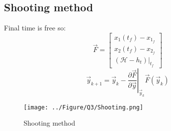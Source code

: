 \subsection{Shooting method}
Final time is free so:
$$
\vec{F} = \begin{bmatrix}
	x_1(t_f) - x_{1_f}\\
	x_2(t_f) - x_{2_f}\\
	\left.(\mathcal{H} - h_t)\right\vert_{t_f}
\end{bmatrix}
$$
$$
\vec{y}_{k+1} = \vec{y}_k - \left.\dfrac{\partial \vec{F}}{\partial \vec{y}}
\right\vert_{\vec{y}_k}
\vec{F}(\vec{y}_k)
$$
\begin{figure}[H]
	\caption{Shooting method}
	\centering
	\texttt{[image: ../Figure/Q3/Shooting.png]}
\end{figure}
